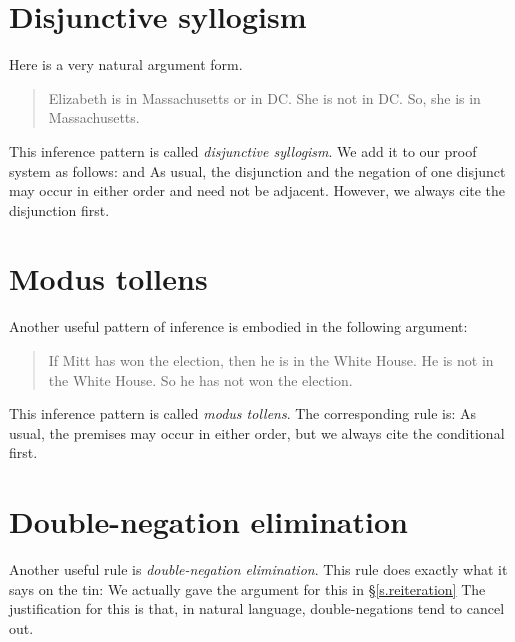 \section{Disjunctive syllogism}
Here is a very natural argument form.
	\begin{quote}
		Elizabeth is in Massachusetts or in DC. She is not in DC. So, she is in Massachusetts.
	\end{quote}
This inference pattern is called \emph{disjunctive syllogism}. We add it to our proof system as follows:
and
As usual, the disjunction and the negation of one disjunct may occur in either order and need not be adjacent. However, we always cite the disjunction first. 

\section{Modus tollens}
Another useful pattern of inference is embodied in the following argument:
	\begin{quote}
		If Mitt has won the election, then he is in the White House. He is not in the White House. So he has not won the election.
	\end{quote}
This inference pattern is called \emph{modus tollens}. The corresponding rule is:
As usual, the premises may occur in either order, but we always cite the conditional first. 

\section{Double-negation elimination}
Another useful rule is \emph{double-negation elimination}. This rule does exactly what it says on the tin:
We actually gave the argument for this in \S\ref{s.reiteration}
The justification for this is that, in natural language, double-negations tend to cancel out. 

